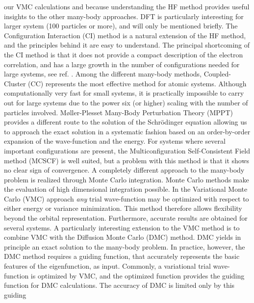our VMC calculations and because understanding the HF method provides
useful insights to the other many-body approaches. DFT is particularly
interesting for larger system (100 particles or more), and will only
be mentioned briefly. 
\newline
%
\newline
The Configuration Interaction (CI) method is a natural extension of the
HF method, and the principles behind it are easy to understand.
The principal shortcoming of the CI
method is that it does not provide a compact description of the electron
correlation, and has a large growth in the number of configurations
needed for large systems, see ref. \cite{helgaker2002}. Among the
different many-body methods, Coupled-Cluster (CC) represents the most
effective method for atomic systems. Although computationally very
fast for small systems, it is practically impossible to carry out for
large systems due to the power six (or higher) scaling with the number
of particles involved. M\o ller-Plesset Many-Body Perturbation Theory
(MPPT) provides a different route to the solution of the Schr\"odinger
equation allowing us to approach the exact solution in a systematic
fashion based on an order-by-order expansion of the wave-function and
the energy. For systems where several important configurations are
present, the Multiconfiguration Self-Consistent Field method (MCSCF)
is well suited, but a problem with this method is that it shows no
clear sign of convergence.
\newline
%
\newline
A completely different approach to the many-body problem is realized
through Monte Carlo integration. Monte Carlo methods make
the evaluation of high dimensional integration possible. In the
Variational Monte Carlo (VMC) approach \emph{any} trial wave-function
may be optimized with respect to either energy or variance
minimization. This method therefore allows flexibility beyond the
orbital representation. Furthermore, accurate results are obtained for
several systems. A particularly interesting extension to
the VMC method is to combine VMC with the Diffusion Monte Carlo (DMC)
method. DMC yields in principle an exact solution to the many-body
problem. In practice, however, the DMC method requires a guiding
function, that accurately represents the basic features of the
eigenfunction, as input. Commonly, 
a variational trial wave-function is optimized by VMC, and the
optimized function provides the guiding function for DMC
calculations. The accuracy of DMC is limited only by this guiding
